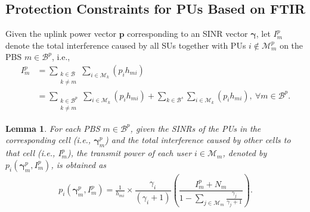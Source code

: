 \documentclass[journal,twoside]{IEEEtran}
\newcommand{\B}{\mathcal{B}}
\newcommand{\M}{\mathcal{M}}
\newcommand{\pbold}{\mathbf{p}}
\newcommand{\gammabold}{\boldsymbol{\gamma}}
\newtheorem {lemma}{Lemma}
\begin{document}
\subsection{Protection Constraints for PUs Based on FTIR}
	Given the uplink power vector $\pbold$ corresponding to an SINR vector $\gammabold$, let $I^p_m$ denote the total interference caused by all SUs together with PUs $i\notin \M^p_m$ on the PBS $m\in\B^p$, i.e.,
	\begin{align}
		\label{eq:231}
		I^p_m 
		&=
			\sum_{\substack{k\in\B \\ k\neq m}}\sum_{i\in\M_k} \!\! {(p_i h_{mi})} \nonumber \\
		&= \sum_{\substack{k\in\B^p \\ k\neq m}}\sum_{i\in\M_k} \!\!{(p_i h_{mi})} + \!\! \sum_{k\in\B^s}\sum_{i\in\M_k}\!\!{(p_i h_{mi})},
		\ \forall m\in\B^p.
	\end{align}
\begin{lemma}
		For each PBS $m\in\B^p$, given the SINRs of the PUs in the corresponding cell (i.e., $\gammabold^p_m$) and the total interference caused by other cells to that cell (i.e., $I^p_m$), the transmit power of each user $i\in\M_m$, denoted by $p_i(\gammabold^p_m,I^p_m)$, is obtained as
		\begin{align}
			\label{eq:pi_FTIR}
			p_i(\gammabold^p_m,I^p_m)= \frac{1}{h_{mi}}\!\times\!\dfrac{\gamma_i}{(\gamma_i+1)} \left( \dfrac{ I^p_m + N_m} {1- \! \sum\limits_{j\in\M_m}\!\!\! \frac{\gamma_j}{\gamma_j+1}} \right).
		\end{align}
	\end{lemma}
\end{document}
